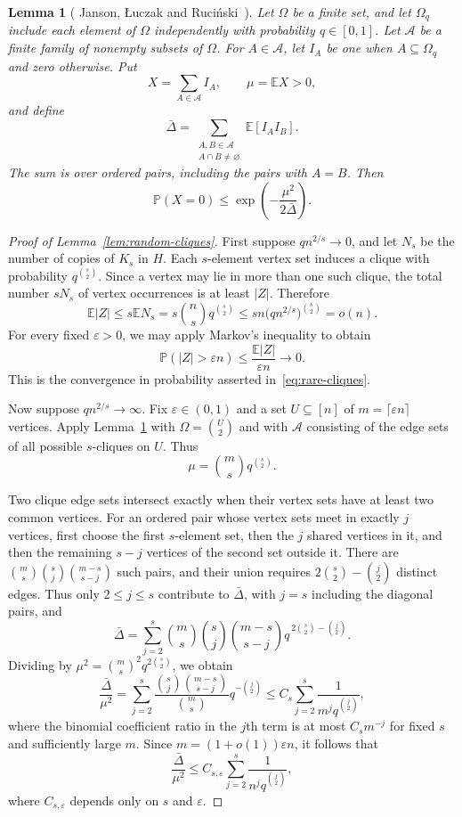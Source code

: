 \documentclass[11pt]{article}
\newtheorem{lemma}[theorem]{Lemma}
\numberwithin{equation}{section}
\newcommand{\Prob}{\mathbb P}
\newcommand{\E}{\mathbb E}
\begin{document}
\begin{lemma}[  {Janson, \L uczak and Ruci\'nski~{\cite[Theorem~2.14]{JLR}}}]\label{lem:janson}
Let $\Omega$ be a finite set, and let $\Omega_q$ include each element of $\Omega$ independently with probability $q\in[0,1]$. Let $\mathcal A$ be a finite family of nonempty subsets of $\Omega$. For $A\in\mathcal A$, let $I_A$ be one when $A\subseteq\Omega_q$ and zero otherwise. Put
\[
 X=\sum_{A\in\mathcal A}I_A,\qquad
 \mu=\E X>0,
\]
and define
\[
 \bar\Delta
 =\sum_{\substack{A,B\in\mathcal A\\A\cap B\ne\varnothing}}
    \E[I_AI_B].
\]
The sum is over ordered pairs, including the pairs with $A=B$. Then
\[
 \Prob(X=0)\le
 \exp\left(-\frac{\mu^2}{2\bar\Delta}\right).
\]
\end{lemma}

\begin{proof}[Proof of Lemma~\ref{lem:random-cliques}]
  
First suppose $qn^{2/s}\to0$, and let $N_s$ be the number of copies of $K_s$ in $H$. Each $s$-element vertex set induces a clique with probability $q^{\binom s2}$. Since a vertex may lie in more than one such clique, the total number $sN_s$ of vertex occurrences is at least $|Z|$. Therefore
\[
 \E|Z|\le s\E N_s=s\binom nsq^{\binom s2}
 \le sn\bigl(qn^{2/s}\bigr)^{\binom s2}=o(n).
\]
For every fixed $\varepsilon>0$, we may apply Markov's inequality to obtain
\[
 \Prob(|Z|>\varepsilon n)
 \le\frac{\E|Z|}{\varepsilon n}\longrightarrow0.
\]
This is the convergence in probability asserted in~\eqref{eq:rare-cliques}.
 

Now suppose $qn^{2/s}\to\infty$. Fix $\varepsilon\in(0,1)$ and a set $U\subseteq[n]$ of $m=\lceil\varepsilon n\rceil$ vertices. Apply Lemma~\ref{lem:janson} with $\Omega=\binom U2$ and with $\mathcal A$ consisting of the edge sets of all possible $s$-cliques on $U$. Thus
\[
 \mu=\binom msq^{\binom s2}.
\]
  
Two clique edge sets intersect exactly when their vertex sets have at least two common vertices. For an ordered pair whose vertex sets meet in exactly $j$ vertices, first choose the first $s$-element set, then the $j$ shared vertices in it, and then the remaining $s-j$ vertices of the second set outside it. There are $\binom ms\binom sj\binom{m-s}{s-j}$ such pairs, and their union requires $2\binom s2-\binom j2$ distinct edges. Thus only $2\le j\le s$ contribute to $\bar\Delta$, with $j=s$ including the diagonal pairs, and
\[
 \bar\Delta
 =\sum_{j=2}^{s}\binom ms\binom sj\binom{m-s}{s-j}
       q^{\,2\binom s2-\binom j2}.
\]
Dividing by $\mu^2=\binom ms^2q^{2\binom s2}$, we obtain
\[
 \frac{\bar\Delta}{\mu^2}
 =\sum_{j=2}^{s}
    \frac{\binom sj\binom{m-s}{s-j}}{\binom ms}
       q^{-\binom j2}
 \le C_s\sum_{j=2}^{s}\frac1{m^jq^{\binom j2}},
\]
where the binomial coefficient ratio in the $j$th term is at most $C_sm^{-j}$ for fixed $s$ and sufficiently large $m$. Since $m=(1+o(1))\varepsilon n$, it follows that
\[
 \frac{\bar\Delta}{\mu^2}
 \le C_{s,\varepsilon}\sum_{j=2}^{s}
       \frac1{n^jq^{\binom j2}},
\]
where $C_{s,\varepsilon}$ depends only on $s$ and $\varepsilon$.
 

\end{proof}
\end{document}
